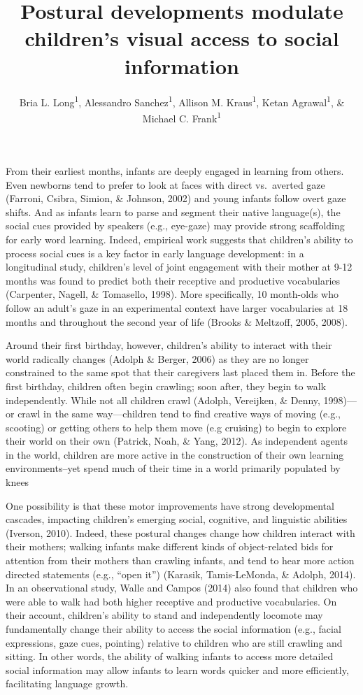 \documentclass[english,man,floatsintext]{apa6}
\author{Bria L. Long\textsuperscript{1}, Alessandro Sanchez\textsuperscript{1}, Allison M. Kraus\textsuperscript{1}, Ketan Agrawal\textsuperscript{1}, \& Michael C. Frank\textsuperscript{1}}
\affiliation{
\vspace{0.5cm}
\textsuperscript{1} Department of Psychology, Stanford University}
\title{Postural developments modulate children's visual access to social
information}
\date{}
\begin{document}
\maketitle

From their earliest months, infants are deeply engaged in learning from
others. Even newborns tend to prefer to look at faces with direct
vs.~averted gaze (Farroni, Csibra, Simion, \& Johnson, 2002) and young
infants follow overt gaze shifts. And as infants learn to parse and
segment their native language(s), the social cues provided by speakers
(e.g., eye-gaze) may provide strong scaffolding for early word learning.
Indeed, empirical work suggests that children's ability to process
social cues is a key factor in early language development: in a
longitudinal study, children's level of joint engagement with their
mother at 9-12 months was found to predict both their receptive and
productive vocabularies (Carpenter, Nagell, \& Tomasello, 1998). More
specifically, 10 month-olds who follow an adult's gaze in an
experimental context have larger vocabularies at 18 months and
throughout the second year of life (Brooks \& Meltzoff, 2005, 2008).

Around their first birthday, however, children's ability to interact
with their world radically changes (Adolph \& Berger, 2006) as they are
no longer constrained to the same spot that their caregivers last placed
them in. Before the first birthday, children often begin crawling; soon
after, they begin to walk independently. While not all children crawl
(Adolph, Vereijken, \& Denny, 1998)---or crawl in the same
way---children tend to find creative ways of moving (e.g., scooting) or
getting others to help them move (e.g cruising) to begin to explore
their world on their own (Patrick, Noah, \& Yang, 2012). As independent
agents in the world, children are more active in the construction of
their own learning environments--yet spend much of their time in a world
primarily populated by knees

One possibility is that these motor improvements have strong
developmental cascades, impacting children's emerging social, cognitive,
and linguistic abilities (Iverson, 2010). Indeed, these postural changes
change how children interact with their mothers; walking infants make
different kinds of object-related bids for attention from their mothers
than crawling infants, and tend to hear more action directed statements
(e.g., \enquote{open it}) (Karasik, Tamis-LeMonda, \& Adolph, 2014). In
an observational study, Walle and Campos (2014) also found that children
who were able to walk had both higher receptive and productive
vocabularies. On their account, children's ability to stand and
independently locomote may fundamentally change their ability to access
the social information (e.g., facial expressions, gaze cues, pointing)
relative to children who are still crawling and sitting. In other words,
the ability of walking infants to access more detailed social
information may allow infants to learn words quicker and more
efficiently, facilitating language growth.
\end{document}
